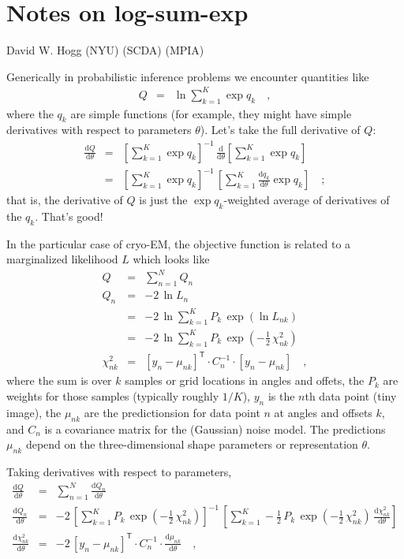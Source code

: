 \documentclass[12pt]{article}
\newcommand{\like}{L}
\newcommand{\dd}{\mathrm{d}}
\newcommand{\inverse}{^{-1}}
\newcommand{\transpose}{^{\mathsf{T}}}
\begin{document}
\section*{Notes on log-sum-exp}
\noindent
David W. Hogg (NYU) (SCDA) (MPIA)

\bigskip

Generically in probabilistic inference problems we encounter quantities like
\begin{eqnarray}
  Q
  &=& \ln\sum_{k=1}^K\exp q_k
  \quad,
\end{eqnarray}
where the $q_k$ are simple functions (for example, they might have simple
derivatives with respect to parameters $\theta$).
Let's take the full derivative of $Q$:
\begin{eqnarray}
  \frac{\dd Q}{\dd\theta}
  &=& \left[\sum_{k=1}^K\exp q_k\right]\inverse
      \,\frac{\dd}{\dd\theta}\left[\sum_{k=1}^K\exp q_k\right] \\
  &=& \left[\sum_{k=1}^K\exp q_k\right]\inverse
      \,\left[\sum_{k=1}^K\frac{\dd q_k}{\dd\theta}\exp q_k\right]
  \quad;
\end{eqnarray}
that is, the derivative of $Q$ is just the $\exp q_k$-weighted average
of derivatives of the $q_k$.
That's good!

In the particular case of cryo-EM, the objective function is related
to a marginalized likelihood $\like$ which looks like
\begin{eqnarray}
  Q
  &=&
  \sum_{n=1}^N Q_n \\
  Q_n
  &=& -2\,\ln\like_n \\
  &=& -2\,\ln\sum_{k=1}^K P_k\,\exp(\ln\like_{nk}) \\
  &=& -2\,\ln\sum_{k=1}^K P_k\,\exp(-\frac{1}{2}\,\chi^2_{nk}) \\
  \chi^2_{nk}
  &=& [y_n - \mu_{nk}]\transpose\cdot C_n\inverse\cdot [y_n - \mu_{nk}]
  \quad,
\end{eqnarray}
where the sum is over $k$ samples or grid locations in angles and
offets, the $P_k$ are weights for those samples (typically roughly
$1/K$), $y_n$ is the $n$th data point (tiny image), the $\mu_{nk}$ are
the predictionsion for data point $n$ at angles and offsets $k$, and
$C_n$ is a covariance matrix for the (Gaussian) noise model.
The predictions $\mu_{nk}$ depend on the three-dimensional shape
parameters or representation $\theta$.

Taking derivatives with respect to parameters,
\begin{eqnarray}
  \frac{\dd Q}{\dd\theta}
  &=&
  \sum_{n=1}^N \frac{\dd Q_n}{\dd\theta} \\
  \frac{\dd Q_n}{\dd\theta}
  &=& -2\,\left[\sum_{k=1}^K P_k\,\exp(-\frac{1}{2}\,\chi^2_{nk})\right]\inverse
        \,\left[\sum_{k=1}^K -\frac{1}{2}\,P_k\,\exp(-\frac{1}{2}\,\chi^2_{nk})\,\frac{\dd\chi^2_{nk}}{\dd\theta}\right] \\
  \frac{\dd\chi^2_{nk}}{\dd\theta}
  &=& -2\,[y_n - \mu_{nk}]\transpose\cdot C_n\inverse\cdot\frac{\dd\mu_{nk}}{\dd\theta}
  \quad,
\end{eqnarray}
\end{document}
